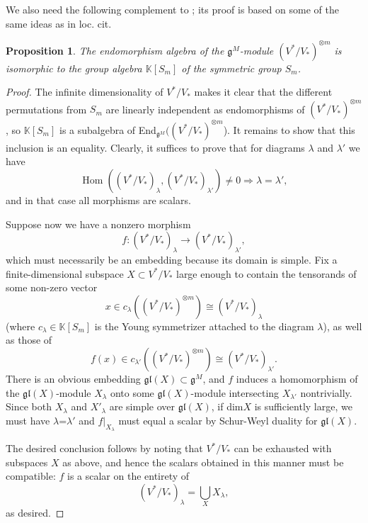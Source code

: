 \documentclass[11pt]{article}
\theoremstyle{plain}
\newtheorem{proposition}[lemma]{Proposition}
\theoremstyle{nonumberplain}
\theoremstyle{plain}
\theoremstyle{nonumberplain}
\newtheorem{proof}{Proof}
\newcommand\bK{{\mathbb K}}
\newcommand\fg{\mathfrak{g}}
\newcommand\fgl{\mathfrak{gl}}
\DeclareMathOperator{\Hom}{\mathrm{Hom}}
\begin{document}
We also need the following complement to \cite[Proposition 1]{Chi14}; its proof is based on some of the same ideas as in loc. cit.  


\begin{proposition}\label{pr.S-W}
  The endomorphism algebra of the $\fg^M$-module $(V^*/V_*)^{\otimes m}$ is isomorphic to the group algebra $\bK\left[S_m\right]$ of the symmetric group $S_m$. 
\end{proposition}
\begin{proof}
  The infinite dimensionality of $V^*/V_*$ makes it clear that the different permutations from $S_m$ are linearly independent as endomorphisms of $(V^*/V_*)^{\otimes m}$, so $\mathbb{K}[S_m]$ is a subalgebra of End$_{\mathfrak{g}^M}((V^*/V_*)^{\otimes m}$).  It remains to show that this inclusion is an equality. Clearly, it suffices to prove that for diagrams $\lambda$ and $\lambda'$ we have
  \begin{equation*}
    \Hom((V^*/V_*)_{\lambda},(V^*/V_*)_{\lambda'})\ne 0\Rightarrow \lambda=\lambda',
  \end{equation*}
  and in that case all morphisms are scalars. 

 Suppose now we have a nonzero morphism
  \begin{equation*}
    f:(V^*/V_*)_{\lambda}\to (V^*/V_*)_{\lambda'},
  \end{equation*}
  which must necessarily be an embedding because its domain is simple. Fix a finite-dimensional subspace $X\subset V^*/V_*$ large enough to contain the tensorands of some non-zero vector
  \begin{equation*}
    x\in c_\lambda ((V^*/V_*)^{\otimes m})\cong (V^*/V_*)_{\lambda}
  \end{equation*}
  (where $c_\lambda\in \bK[S_m]$ is the Young symmetrizer attached to the diagram $\lambda$), as well as those of
  \begin{equation*}
    f(x)\in c_{\lambda'}((V^*/V_*)^{\otimes m})\cong (V^*/V_*)_{\lambda'}.
  \end{equation*}
  There is an obvious embedding $\mathfrak{gl}(X) \subset \mathfrak{g}^M$, and $f$ induces a homomorphism of the $\fgl(X)$-module  $X_\lambda$ onto some $\mathfrak{gl}(X)$-module intersecting $X_{\lambda'}$ nontrivially. Since both $X_\lambda$ and $X'_{\lambda}$ are simple over $\fgl(X)$, if dim$X$ is sufficiently large, we must have $\lambda$=$\lambda'$
and $f|_{X_\lambda}$ must equal  a scalar  by Schur-Weyl duality for $\fgl(X)$.

  The desired conclusion follows by noting that $V^*/V_*$ can be exhausted with subspaces $X$ as above, and hence the scalars obtained in this manner must be compatible: $f$ is a scalar on the entirety of
  \begin{equation*}
    (V^*/V_*)_\lambda = \bigcup_X X_\lambda,
  \end{equation*}
as desired. 
\end{proof}
\end{document}
